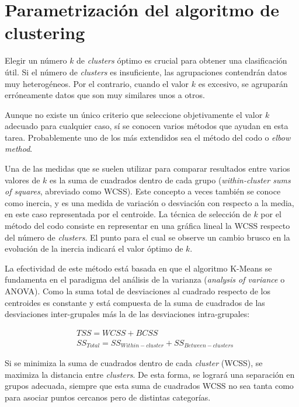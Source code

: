\section{Parametrización del algoritmo de clustering}\label{sec:paramclustering}

Elegir un número $k$ de \emph{clusters} óptimo es crucial para obtener una clasificación útil.
Si el número de \emph{clusters} es insuficiente, las agrupaciones contendrán datos muy heterogéneos.
Por el contrario, cuando el valor $k$ es excesivo, se agruparán erróneamente datos que son muy similares unos a otros.

Aunque no existe un único criterio que seleccione objetivamente el valor $k$ adecuado para cualquier caso, sí se conocen varios métodos que ayudan en esta tarea.
Probablemente uno de los más extendidos sea el método del codo o \emph{elbow method}.

Una de las medidas que se suelen utilizar para comparar resultados entre varios valores de $k$ es la suma de cuadrados dentro de cada grupo (\emph{within-cluster sums of squares}, abreviado como WCSS).
Este concepto a veces también se conoce como inercia, y es una medida de variación o desviación con respecto a la media, en este caso representada por el centroide.
La técnica de selección de $k$ por el método del codo consiste en representar en una gráfica lineal la WCSS respecto del número de \emph{clusters}.
El punto para el cual se observe un cambio brusco en la evolución de la inercia indicará el valor óptimo de $k$.

La efectividad de este método está basada en que el algoritmo K-Means se fundamenta en el paradigma del análisis de la varianza (\emph{analysis of variance} o ANOVA).
Como la suma total de desviaciones al cuadrado respecto de los centroides es constante y está compuesta de la suma de cuadrados de las desviaciones inter-grupales más la de las desviaciones intra-grupales:

\begin{eqnarray*}
    & TSS = WCSS + BCSS \\
    & SS_{Total} = SS_{Within-cluster} + SS_{Between-clusters}
\end{eqnarray*}

Si se minimiza la suma de cuadrados dentro de cada \emph{cluster} (WCSS), se maximiza la distancia entre \emph{clusters}.
De esta forma, se logrará una separación en grupos adecuada, siempre que esta suma de cuadrados WCSS no sea tanta como para asociar puntos cercanos pero de distintas categorías.

